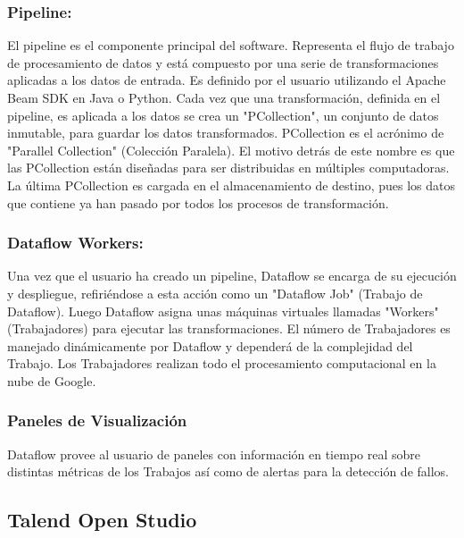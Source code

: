 \subsubsection{Pipeline:}

El pipeline es el componente principal del software. Representa el flujo de trabajo de procesamiento de datos y est\'a 
compuesto por una serie de transformaciones aplicadas a los datos de entrada. Es definido por el usuario utilizando el 
Apache Beam SDK en Java o Python. Cada vez que una transformación, definida en el pipeline, es aplicada a los datos se crea 
un "PCollection", un conjunto de datos inmutable, para guardar los datos transformados. PCollection es el acr\'onimo de 
"Parallel Collection" (Colecci\'on 
Paralela). El motivo detrás de este nombre es que las PCollection están diseñadas para ser distribuidas en múltiples 
computadoras. La \'ultima PCollection es cargada en el almacenamiento de destino, pues los datos que contiene ya han pasado 
por todos los procesos de transformaci\'on. 

\subsubsection{Dataflow Workers:}

Una vez que el usuario ha creado un pipeline, Dataflow se encarga de su ejecución y despliegue, refiriéndose a esta 
acción como un "Dataflow Job" (Trabajo de Dataflow). Luego Dataflow asigna unas m\'aquinas virtuales llamadas "Workers" 
(Trabajadores) para ejecutar las transformaciones. El n\'umero de Trabajadores es manejado din\'amicamente por Dataflow 
y depender\'a de la complejidad del Trabajo. Los Trabajadores realizan todo el procesamiento computacional en la nube 
de Google.

\subsubsection{Paneles de Visualizaci\'on}

Dataflow provee al usuario de paneles con informaci\'on en tiempo real sobre distintas m\'etricas de los Trabajos as\'i 
como de alertas para la detecci\'on de fallos.





\subsection{Talend Open Studio}

